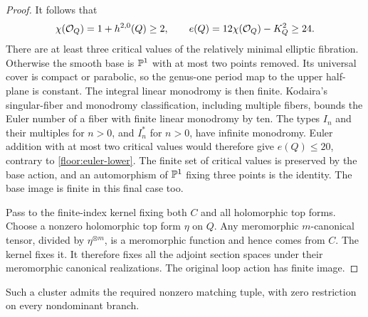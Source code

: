\begin{proof}
It follows that
\begin{equation}
 \label{floor:euler-lower}
 \chi(\mathcal{O}_Q)=1+h^{2,0}(Q)\ge2,
 \qquad e(Q)=12\chi(\mathcal{O}_Q)-K_Q^2\ge24.
\end{equation}
There are at least three critical values of the relatively
minimal elliptic fibration.  Otherwise the smooth base is
$\mathbb{P}^1$ with at most two points removed.  Its universal cover
is compact or parabolic, so the genus-one period map to the
upper half-plane is constant.  The integral linear monodromy
is then finite.  Kodaira's singular-fiber and monodromy
classification, including multiple fibers, bounds the Euler
number of a fiber with finite linear monodromy by ten.
The types $I_n$ and their multiples for $n>0$, and $I_n^*$
for $n>0$, have infinite monodromy.  Euler addition with at
most two critical values would therefore give $e(Q)\le20$,
contrary to \eqref{floor:euler-lower}.  The finite set of
critical values is preserved by the base action, and an
automorphism of $\mathbb{P}^1$ fixing three points is the identity.
The base image is finite in this final case too.

Pass to the finite-index kernel fixing both $C$ and all
holomorphic top forms.  Choose a nonzero holomorphic top form
$\eta$ on $Q$.  Any meromorphic $m$-canonical tensor, divided
by $\eta^{\otimes m}$, is a meromorphic function and hence
comes from $C$.  The kernel fixes it.  It therefore fixes all
the adjoint section spaces under their meromorphic canonical
realizations.  The original loop action has finite image.
\end{proof}

\begin{lemma}[Matching in non-Moishezon clusters with $r=1$]
\label{floor:nonprojective-r1}
Such a cluster admits the required nonzero matching tuple,
with zero restriction on every nondominant branch.
\end{lemma}

